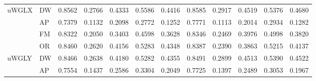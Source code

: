 \begin{table}[h]
{\begin{tabular}{llccccc|ccccc}
uWGLX	& DW &  0.8562&  0.2766&  0.4333&  0.5586& 0.4416&  0.8585&  0.2917&  0.4519&  0.5376& 0.4680 \\
		& AP & 0.7379 & 0.1132 & 0.2098 & 0.2772 & 0.1252& 0.7771& 0.1113& 0.2014& 0.2934& 0.1282 \\
\hline
		& FM &  0.8322&  0.2050&  0.3403&  0.4598& 0.3628& 0.8346&  0.2469&  0.3976&  0.4998&  0.3820\\
		& OR &  0.8460&  0.2620&  0.4156&  0.5283& 0.4348&  0.8387&  0.2390&  0.3863&  0.5215&  0.4137 \\
uWGLY	& DW &  0.8466&  0.2638&  0.4180&  0.5282& 0.4355&  0.8491&  0.2899&  0.4513&  0.5390&  0.4522\\
		& AP & 	0.7554& 	 0.1437& 0.2586 & 0.3304 & 0.2049& 0.7725& 0.1397& 0.2489& 0.3053& 0.1967  \\
\hline
\end{tabular}
}
\end{table}
